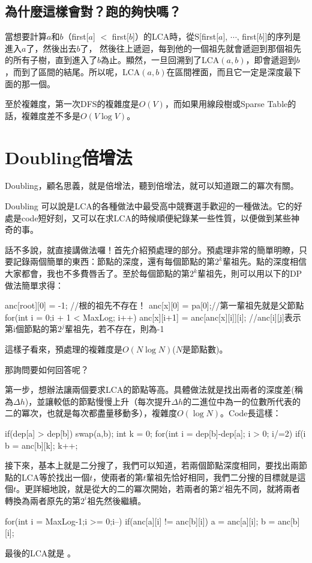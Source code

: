 \documentclass[main.tex]{subfiles}
\begin{document}
			\subsection{為什麼這樣會對？跑的夠快嗎？}
				當想要計算$a$和$b$（first[$a$] $< $ first[$b$]）的LCA時，從S[first[$a$], $\cdots$, first[$b$]]的序列是進入$a$了，然後出去$b$了， 然後往上遞迴，每到他的一個祖先就會遞迴到那個祖先的所有子樹，直到進入了$b$為止。顯然，一旦回溯到了LCA$(a, b)$，即會遞迴到$b$，而到了區間的結尾。所以呢，LCA$(a, b)$在區間裡面，而且它一定是深度最下面的那一個。
				
				至於複雜度，第一次DFS的複雜度是$O(V)$，而如果用線段樹或Sparse Table的話，複雜度差不多是$O(V\log V)$。
	\section{Doubling倍增法}
		Doubling，顧名思義，就是倍增法，聽到倍增法，就可以知道跟二的冪次有關。
		
		Doubling 可以說是LCA的各種做法中最受高中競賽選手歡迎的一種做法。它的好處是code短好刻，又可以在求LCA的時候順便紀錄某一些性質，以便做到某些神奇的事。
		
		話不多說，就直接講做法囉！首先介紹預處理的部分。預處理非常的簡單明瞭，只要記錄兩個簡單的東西：節點的深度，還有每個節點的第$2^k $輩祖先。點的深度相信大家都會，我也不多費唇舌了。至於每個節點的第$2^k $輩祖先，則可以用以下的DP做法簡單求得：
\begin{C++}
anc[root][0] = -1; //根的祖先不存在！
anc[x][0] = pa[0];//第一輩祖先就是父節點 
for(int i = 0;i + 1 < MaxLog; i++)
{
	anc[x][i+1] = anc[anc[x][i]][i]; //anc[i][j]表示第i個節點的第$2^j $輩祖先，若不存在，則為-1
}
\end{C++}
		這樣子看來，預處理的複雜度是$O(N\log N)$($N$是節點數)。
		
		那詢問要如何回答呢？
		
		第一步，想辦法讓兩個要求LCA的節點等高。具體做法就是找出兩者的深度差(稱為$\Delta h$)，並讓較低的節點慢慢上升（每次提升$\Delta h$的二進位中為一的位數所代表的二的冪次，也就是每次都盡量移動多），複雜度$O(\log N)$。Code長這樣：
\begin{C++}
if(dep[a] > dep[b])
	swap(a,b);
int k  = 0;
for(int i = dep[b]-dep[a]; i > 0; i/=2)
{
	if(i %
		b = anc[b][k];
	k++;
}
\end{C++}
		接下來，基本上就是二分搜了，我們可以知道，若兩個節點深度相同，要找出兩節點的LCA等於找出一個$t$，使兩者的第$t$輩祖先恰好相同，我們二分搜的目標就是這個$t$。更詳細地說，就是從大的二的冪次開始，若兩者的第$2^i$祖先不同，就將兩者轉換為兩者原先的第$2^i$祖先然後繼續。
		\begin{C++}
for(int i = MaxLog-1;i >= 0;i--)
{
	if(anc[a][i] != anc[b][i])
	{
		a = anc[a][i];
		b = anc[b][i];
	}
}
		\end{C++}
		最後的LCA就是 。
		
\end{document}
